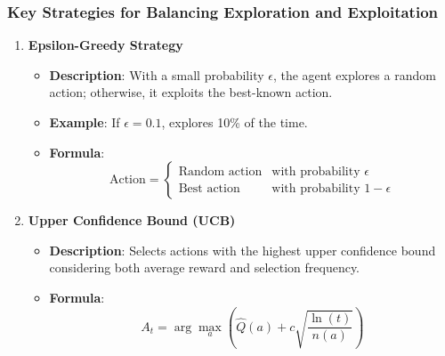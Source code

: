 \documentclass[aspectratio=169]{beamer}
\begin{document}
\begin{frame}[fragile]
    \frametitle{Key Strategies for Balancing Exploration and Exploitation}
    \begin{enumerate}
        \item \textbf{Epsilon-Greedy Strategy}
            \begin{itemize}
                \item \textbf{Description}: With a small probability $\epsilon$, the agent explores a random action; otherwise, it exploits the best-known action.
                \item \textbf{Example}: If $\epsilon = 0.1$, explores 10\% of the time.
                \item \textbf{Formula}:
                \begin{equation}
                    \text{Action} =
                    \begin{cases}
                        \text{Random action} & \text{with probability } \epsilon \\
                        \text{Best action} & \text{with probability } 1 - \epsilon
                    \end{cases}
                \end{equation}
            \end{itemize}
        \item \textbf{Upper Confidence Bound (UCB)}
            \begin{itemize}
                \item \textbf{Description}: Selects actions with the highest upper confidence bound considering both average reward and selection frequency.
                \item \textbf{Formula}:
                \begin{equation}
                    A_t = \arg\max_a \left( \hat{Q}(a) + c \sqrt{\frac{\ln(t)}{n(a)}} \right)
                \end{equation}
            \end{itemize}
    \end{enumerate}
\end{frame}
\end{document}
